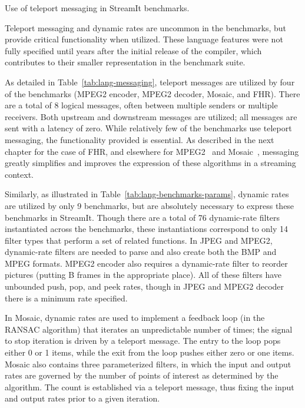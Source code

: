 \begin{table}[t!]
\caption{Use of teleport messaging in StreamIt 
benchmarks.\protect\label{tab:lang-messaging}}
\end{table}

\item {\boldit Teleport messaging and dynamic rates are uncommon in 
the benchmarks, but provide critical functionality when utilized.}
These language features were not fully specified until years after the
initial release of the compiler, which contributes to their smaller
representation in the benchmark suite.

As detailed in Table~\ref{tab:lang-messaging}, teleport messages are
utilized by four of the benchmarks (MPEG2 encoder, MPEG2 decoder,
Mosaic, and FHR).  There are a total of 8 logical messages, often
between multiple senders or multiple receivers.  Both upstream and
downstream messages are utilized; all messages are sent with a latency
of zero.  While relatively few of the benchmarks use teleport
messaging, the functionality provided is essential.  As described in
the next chapter for the case of FHR, and elsewhere for
MPEG2~\cite{drake-thesis} and Mosaic~\cite{aziz-thesis}, messaging
greatly simplifies and improves the expression of these algorithms in
a streaming context.

Similarly, as illustrated in Table~\ref{tab:lang-benchmarks-params},
dynamic rates are utilized by only 9 benchmarks, but are absolutely
necessary to express these benchmarks in StreamIt.  Though there are a
total of 76 dynamic-rate filters instantiated across the benchmarks,
these instantiations correspond to only 14 filter types that perform a
set of related functions.  In JPEG and MPEG2, dynamic-rate filters are
needed to parse and also create both the BMP and MPEG formats.  MPEG2
encoder also requires a dynamic-rate filter to reorder pictures
(putting B frames in the appropriate place).  All of these filters
have unbounded push, pop, and peek rates, though in JPEG and MPEG2
decoder there is a minimum rate specified.

In Mosaic, dynamic rates are used to implement a feedback loop (in the
RANSAC algorithm) that iterates an unpredictable number of times; the
signal to stop iteration is driven by a teleport message.  The entry
to the loop pops either 0 or 1 items, while the exit from the loop
pushes either zero or one items.  Mosaic also contains three
parameterized filters, in which the input and output rates are
governed by the number of points of interest as determined by the
algorithm.  The count is established via a teleport message, thus
fixing the input and output rates prior to a given iteration.

